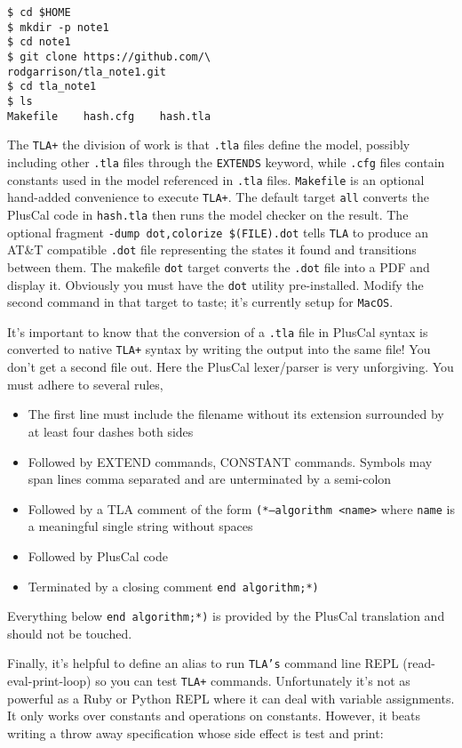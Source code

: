 \documentclass[twocolumn]{article}
\begin{document}
\begin{verbatim}
$ cd $HOME
$ mkdir -p note1
$ cd note1
$ git clone https://github.com/\
rodgarrison/tla_note1.git
$ cd tla_note1
$ ls
Makefile	hash.cfg	hash.tla
\end{verbatim}

The \texttt{TLA+} the division of work is that \texttt{.tla} files define the model, possibly including other \texttt{.tla} files through the \texttt{EXTENDS} keyword, while \texttt{.cfg} files contain constants used in the model referenced in \texttt{.tla} files. \texttt{Makefile} is an optional hand-added convenience to execute \texttt{TLA+}. The default target \texttt{all} converts the PlusCal code in \texttt{hash.tla} then runs the model checker on the result. The optional fragment \texttt{-dump dot,colorize \$(FILE).dot} tells \texttt{TLA} to produce an AT\&T compatible \texttt{.dot} file representing the states it found and transitions between them. The makefile \texttt{dot} target converts the \texttt{.dot} file into a PDF and display it. Obviously you must have the \texttt{dot} utility pre-installed. Modify the second command in that target to taste; it's currently setup for \texttt{MacOS}.

It's important to know that the conversion of a \texttt{.tla} file in PlusCal syntax is converted to native \texttt{TLA+} syntax by writing the output into the same file! You don't get a second file out. Here the PlusCal lexer/parser is very unforgiving. You must adhere to several rules,

\begin{itemize}
\item The first line must include the filename without its extension surrounded by at least four dashes both sides
\item Followed by EXTEND commands, CONSTANT commands. Symbols may span lines comma separated and are unterminated by a semi-colon
\item Followed by a TLA comment of the form \texttt{(*--algorithm <name>} where \texttt{name} is a meaningful single string without spaces
\item Followed by PlusCal code
\item Terminated by a closing comment \texttt{end algorithm;*)}
\end{itemize}

\noindent Everything below \texttt{end algorithm;*)} is provided by the PlusCal translation and should not be touched.

Finally, it's helpful to define an alias to run \texttt{TLA's} command line REPL (read-eval-print-loop) so you can test \texttt{TLA+} commands. Unfortunately it's not as powerful as a Ruby or Python REPL where it can deal with variable assignments. It only works over constants and operations on constants. However, it beats writing a throw away specification whose side effect is test and print: 
\end{document}
